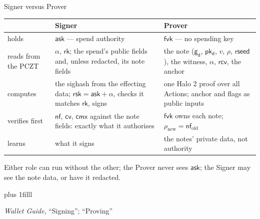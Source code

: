 \documentclass[aspectratio=169,11pt]{beamer}
\newcommand{\nfsym}{\ensuremath{\mathsf{nf}}}
\newcommand{\cmx}{\ensuremath{\mathsf{cmx}}}
\newcommand{\cvsym}{\ensuremath{\mathsf{cv}}}
\newcommand{\rksym}{\ensuremath{\mathsf{rk}}}
\newcommand{\gd}{\ensuremath{\mathsf{g_d}}}
\newcommand{\pkd}{\ensuremath{\mathsf{pk_d}}}
\newcommand{\asksym}{\ensuremath{\mathsf{ask}}}
\newcommand{\fvk}{\ensuremath{\mathsf{fvk}}}
\newcommand{\rcv}{\ensuremath{\mathsf{rcv}}}
\newcommand{\rsk}{\ensuremath{\mathsf{rsk}}}
\newcommand{\src}[1]{\par\vskip0pt plus 1filll
  {\fontsize{6}{7.2}\selectfont\color{arbdim}\raggedright #1\par}}
\begin{document}
\begin{frame}{Signer versus Prover}
\begin{center}\small
\begin{tabular}{@{}lp{}p{}@{}}
\toprule
 & Signer & Prover \\
\midrule
holds & \asksym{} --- spend authority & \fvk{} --- no spending key \\
reads from the PCZT & $\alpha$, \rksym; the spend's public fields and,
  unless redacted, its note fields & the note ($\gd$, $\pkd$, $v$,
  $\rho$, $\mathsf{rseed}$), the witness, $\alpha$, \rcv, the anchor \\
computes & the sighash from the effecting data; $\rsk = \asksym +
  \alpha$, checks it matches \rksym, signs & one Halo 2 proof over all
  Actions; anchor and flags as public inputs \\
verifies first & $\nfsym$, $\cvsym$, $\cmx$ against the note fields:
  exactly what it authorises & \fvk{} owns each note;
  $\rho_{\mathrm{new}} = \nfsym_{\mathrm{old}}$ \\
learns & what it signs & the notes' private data, not authority \\
\bottomrule
\end{tabular}
\end{center}
\small
Either role can run without the other; the Prover never sees \asksym;
the Signer may see the note data, or have it redacted.
\src{\emph{Wallet Guide}, ``Signing''; ``Proving''}
\end{frame}
\end{document}
